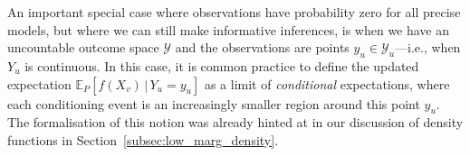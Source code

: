 \documentclass[3p]{elsarticle}
\newcommand{\observs}{\mathcal{Y}}
\begin{document}
An important special case where observations have probability zero for all precise models, but where we can still make informative inferences, is when we have an uncountable outcome space $\observs$ and the observations are points $y_u\in\observs_u$---i.e., when $Y_u$ is continuous. In this case, it is common practice to define the updated expectation $\mathbb{E}_P[f(X_v)\,\vert\,Y_u=y_u]$ as a limit of \emph{conditional} expectations, where each conditioning event is an increasingly smaller region around this point $y_u$. The formalisation of this notion was already hinted at in our discussion of density functions in Section~\ref{subsec:low_marg_density}.

\end{document}
